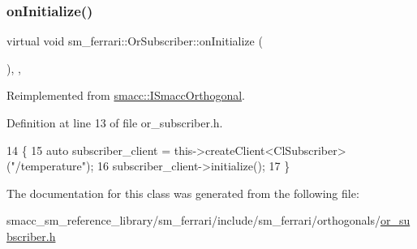 \subsubsection{\texorpdfstring{on\+Initialize()}{onInitialize()}}
{\footnotesize\ttfamily virtual void sm\+\_\+ferrari\+::\+Or\+Subscriber\+::on\+Initialize (\begin{DoxyParamCaption}{ }\end{DoxyParamCaption})\hspace{0.3cm}{\ttfamily [inline]}, {\ttfamily [override]}, {\ttfamily [virtual]}}



Reimplemented from \hyperlink{classsmacc_1_1ISmaccOrthogonal_a6bb31c620cb64dd7b8417f8705c79c7a}{smacc\+::\+I\+Smacc\+Orthogonal}.



Definition at line 13 of file or\+\_\+subscriber.\+h.


\begin{DoxyCode}
14     \{
15         \textcolor{keyword}{auto} subscriber\_client = this->createClient<ClSubscriber>(\textcolor{stringliteral}{"/temperature"});
16         subscriber\_client->initialize();
17     \}
\end{DoxyCode}


The documentation for this class was generated from the following file\+:\begin{DoxyCompactItemize}
\item 
smacc\+\_\+sm\+\_\+reference\+\_\+library/sm\+\_\+ferrari/include/sm\+\_\+ferrari/orthogonals/\hyperlink{sm__ferrari_2include_2sm__ferrari_2orthogonals_2or__subscriber_8h}{or\+\_\+subscriber.\+h}\end{DoxyCompactItemize}
